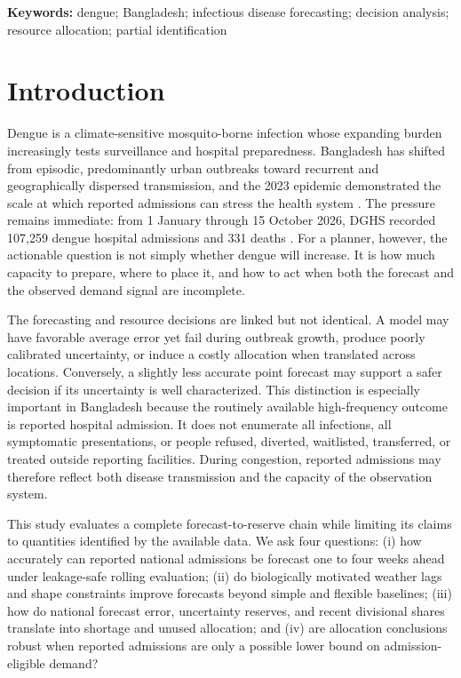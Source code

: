 \documentclass[11pt]{article}
\begin{document}
\noindent\textbf{Keywords:} dengue; Bangladesh; infectious disease forecasting; decision analysis; resource allocation; partial identification

\section{Introduction}

Dengue is a climate-sensitive mosquito-borne infection whose expanding burden increasingly tests surveillance and hospital preparedness. Bangladesh has shifted from episodic, predominantly urban outbreaks toward recurrent and geographically dispersed transmission, and the 2023 epidemic demonstrated the scale at which reported admissions can stress the health system \citep{hasan2024,bhowmik2026,whoSitrep2023}. The pressure remains immediate: from 1 January through 15 October 2026, DGHS recorded 107,259 dengue hospital admissions and 331 deaths \citep{dghsDashboard}. For a planner, however, the actionable question is not simply whether dengue will increase. It is how much capacity to prepare, where to place it, and how to act when both the forecast and the observed demand signal are incomplete.

The forecasting and resource decisions are linked but not identical. A model may have favorable average error yet fail during outbreak growth, produce poorly calibrated uncertainty, or induce a costly allocation when translated across locations. Conversely, a slightly less accurate point forecast may support a safer decision if its uncertainty is well characterized. This distinction is especially important in Bangladesh because the routinely available high-frequency outcome is reported hospital admission. It does not enumerate all infections, all symptomatic presentations, or people refused, diverted, waitlisted, transferred, or treated outside reporting facilities. During congestion, reported admissions may therefore reflect both disease transmission and the capacity of the observation system.

This study evaluates a complete forecast-to-reserve chain while limiting its claims to quantities identified by the available data. We ask four questions: (i) how accurately can reported national admissions be forecast one to four weeks ahead under leakage-safe rolling evaluation; (ii) do biologically motivated weather lags and shape constraints improve forecasts beyond simple and flexible baselines; (iii) how do national forecast error, uncertainty reserves, and recent divisional shares translate into shortage and unused allocation; and (iv) are allocation conclusions robust when reported admissions are only a possible lower bound on admission-eligible demand?
\end{document}
